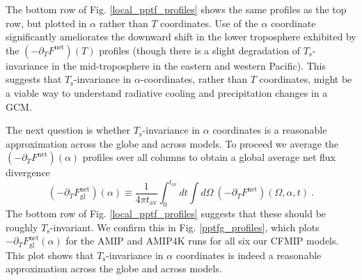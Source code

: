 \documentclass[10pt]{article}
\newcommand{\beqn}{\begin{equation}}
\newcommand{\eeqn}{\end{equation}}
\newcommand{\ppt}{\ensuremath{\partial_T}}
\newcommand{\FLW}{\ensuremath{F^\mathrm{LW}}}
\newcommand{\FLWgl}{\ensuremath{F^\mathrm{LW}_{\mathrm{gl}}}}
\newcommand{\FSWgl}{\ensuremath{F^\mathrm{SW}_{\mathrm{gl}}}}
\newcommand{\Fnet}{\ensuremath{F^\mathrm{net}}}
\newcommand{\Fnetgl}{\ensuremath{F^\mathrm{net}_{\mathrm{gl}}}}
\newcommand{\Fgl}{\ensuremath{F_{\mathrm{gl}}}}
\newcommand{\Ts}{\ensuremath{T_\mathrm{s}}}
\newcommand{\Tsgl}{\ensuremath{T_\mathrm{s,gl}}}
\newcommand{\Kinverse}{\ensuremath{\mathrm{K^{-1}}}}
\newcommand{\tav}{\ensuremath{t_\mathrm{av}}}
\begin{document}
The bottom row of Fig. \ref{local_pptf_profiles} shows the same profiles as the top row, but plotted in $\alpha$ rather than $T$ coordinates. Use of the $\alpha$ coordinate significantly ameliorates the downward shift in the lower troposphere exhibited by the $(-\ppt \Fnet)(T)$ profiles (though there is a slight degradation of \Ts-invariance in the mid-troposphere in the eastern and western Pacific).  This suggests that \Ts-invariance in $\alpha$-coordinates, rather than $T$ coordinates, might be a viable way to understand radiative cooling and precipitation changes in a GCM.

The next question is whether \Ts-invariance in $\alpha$ coordinates is a reasonable approximation across the globe and across models. To proceed we average the $(-\ppt \Fnet)(\alpha)$ profiles over all columns to obtain a global average net flux divergence
	\beqn
		(-\ppt \Fnetgl)(\alpha) \equiv \frac{1}{4\pi\tav}\int_0^{\tav} dt \int d \Omega\  (-\ppt \Fnet)(\Omega,\alpha,t) \ .
		\label{pptfgl_def}
	\eeqn
The bottom row of Fig. \ref{local_pptf_profiles} suggests that these should be roughly \Ts-invariant. We confirm this  in Fig. \ref{pptfg_profiles}, which plots $-\ppt \Fnetgl(\alpha)$ for the AMIP and AMIP4K runs for all six our CFMIP models.  This plot shows that \Ts-invariance in $\alpha$ coordinates is indeed a reasonable approximation across the globe and across models. 



\end{document}
